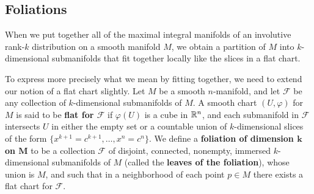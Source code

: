 \subsection{Foliations}
When we put together all of the maximal integral manifolds of an involutive rank-$k$ distribution on a smooth manifold $M$, we obtain a partition of $M$ into $k$-dimensional submanifolds that fit together locally like the slices in a flat chart.\par 
To express more precisely what we mean by fitting together, we need to extend our notion of a flat chart slightly. Let $M$ be a smooth $n$-manifold, and let $\mathcal{F}$ be any collection of $k$-dimensional submanifolds of $M$. A smooth chart $(U,\varphi)$ for $M$ is said to be \textbf{flat for $\mathcal{F}$} if $\varphi(U)$ is a cube in $\mathbb{R}^n$, and each submanifold in $\mathcal{F}$ intersects $U$ in either the empty set or a countable union of $k$-dimensional slices of the form $\{x^{k+1}=c^{k+1},\dots,x^n=c^n\}$. We define a \textbf{foliation of dimension $\bm{k}$ on $\bm{M}$} to be a collection $\mathcal{F}$ of disjoint, connected, nonempty, immersed $k$-dimensional submanifolds of $M$ (called the \textbf{leaves of the foliation}), whose union is $M$, and such that in a neighborhood of each point $p\in M$ there exists a flat chart for $\mathcal{F}$.
